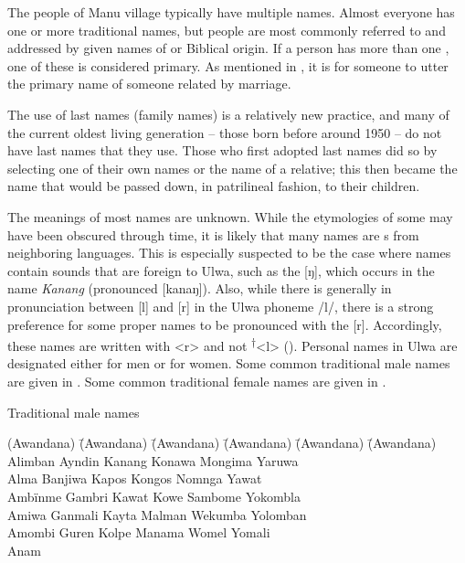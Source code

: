 The people of Manu village typically have multiple names. Almost everyone has one or more traditional names, but people are most commonly referred to and addressed by given names of  or Biblical origin. If a person has more than one , one of these is considered primary. As mentioned in , it is  for someone to utter the primary name of someone related by marriage.

  The use of last names (family names) is a relatively new practice, and many of the current oldest living generation -- those born before around 1950 -- do not have last names that they use. Those who first adopted last names did so by selecting one of their own names or the name of a relative; this then became the name that would be passed down, in patrilineal fashion, to their children.

  The meanings of most names are unknown. While the etymologies of some may have been obscured through time, it is likely that many names are s from neighboring languages. This is especially suspected to be the case where names contain sounds that are foreign to Ulwa, such as the   [ŋ], which occurs in the name \textit{Kanang} (pronounced [kanaŋ]). Also, while there is generally  in pronunciation between [l] and [r] in the Ulwa  phoneme /l/, there is a strong preference for some proper names to be pronounced with the  [r]. Accordingly, these names are written with <r> and not \textsuperscript{†}<l> (). Personal names in Ulwa are designated either for men or for women. Some common traditional male names are given in . Some common traditional female names are given in .



\ea%
    \label{ex:sem:36}
          Traditional male names
\begin{tabbing}
{(Awandana)} \= {(Awandana)} \= {(Awandana)} \= {(Awandana)} \= {(Awandana)} \= {(Awandana)}\kill
Alimban \> Ayndin \> Kanang \> Konawa \> Mongima \> Yaruwa \\
Alma \> Banjiwa \> Kapos \> Kongos \> Nomnga \> Yawat \\
Ambïnme \> Gambri \> Kawat \> Kowe \> Sambome \> Yokombla\\
Amiwa \> Ganmali \> Kayta \> Malman \> Wekumba \> Yolomban\\
Amombi \> Guren \> Kolpe \> Manama \> Womel \> Yomali\\
Anam \> { } \> { } \> { } \> { } \> { }
\end{tabbing}
\z

